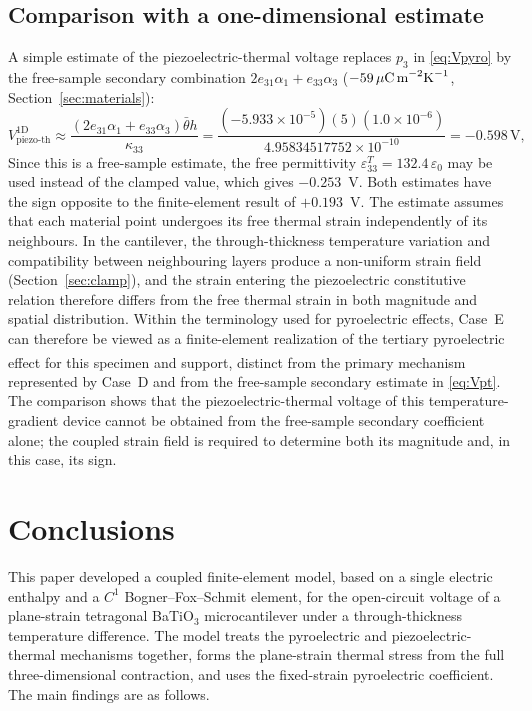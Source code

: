 \documentclass[a4paper, 11pt, twoside]{article}
\newcommand{\supercite}[1]{\!\!\textsuperscript{\cite{#1}}}
\begin{document}
\subsection{Comparison with a one-dimensional estimate}
\label{sec:estimate}

A simple estimate of the piezoelectric-thermal voltage replaces $p_3$ in
\eqref{eq:Vpyro} by the free-sample secondary combination
$2e_{31}\alpha_1+e_{33}\alpha_3$
($-59\,\mu\text{C\,m}^{-2}\text{K}^{-1}$, Section~\ref{sec:materials}):
\begin{equation}
V_{\mathrm{piezo\text{-}th}}^{\mathrm{1D}}
\approx
\frac{(2e_{31}\alpha_1+e_{33}\alpha_3)\bar\theta h}{\kappa_{33}}
=
\frac{(-5.933\times10^{-5})(5)(1.0\times10^{-6})}
{4.95834517752\times10^{-10}}
=-0.598\,\text{V},
\label{eq:Vpt}
\end{equation}
Since this is a free-sample estimate, the free permittivity
$\varepsilon_{33}^T=132.4\,\varepsilon_0$ may be used instead of the clamped value,
which gives $-0.253$~V. Both estimates have the sign opposite to the finite-element
result of $+0.193$~V. The estimate assumes that each material point undergoes its
free thermal strain independently of its neighbours. In the cantilever, the
through-thickness temperature variation and compatibility between neighbouring
layers produce a non-uniform strain field (Section~\ref{sec:clamp}), and the strain
entering the piezoelectric constitutive relation therefore differs from the free
thermal strain in both magnitude and spatial distribution. Within the terminology
used for pyroelectric effects, Case~E can therefore be viewed as a
finite-element realization of the tertiary pyroelectric effect
\supercite{Lang2005Pyro} for this specimen and support, distinct from the primary
mechanism represented by Case~D and from the free-sample secondary estimate in
\eqref{eq:Vpt}. The comparison shows that the piezoelectric-thermal voltage of this
temperature-gradient device cannot be obtained from the free-sample secondary
coefficient alone; the coupled strain field is required to determine both its
magnitude and, in this case, its sign.

\section{Conclusions}
\label{sec:conclusions}

This paper developed a coupled finite-element model, based on a single electric
enthalpy and a $C^1$ Bogner--Fox--Schmit element, for the open-circuit voltage of a
plane-strain tetragonal BaTiO$_3$ microcantilever under a through-thickness temperature
difference. The model treats the pyroelectric and piezoelectric-thermal mechanisms
together, forms the plane-strain thermal stress from the full three-dimensional
contraction, and uses the fixed-strain pyroelectric coefficient. The main findings are
as follows.
\end{document}
